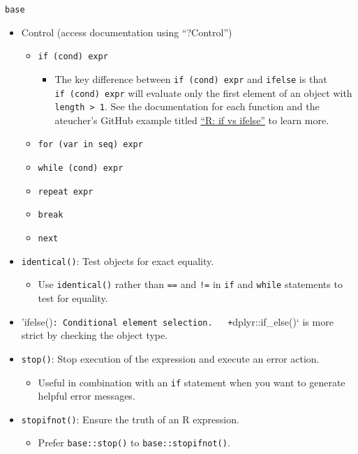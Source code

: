 \documentclass[
]{book}
\providecommand{\tightlist}{%
  \setlength{\itemsep}{0pt}\setlength{\parskip}{0pt}}
\begin{document}
\texttt{base}

\begin{itemize}
\tightlist
\item
  Control (access documentation using ``?Control'')

  \begin{itemize}
  \tightlist
  \item
    \texttt{if\ (cond)\ expr}

    \begin{itemize}
    \tightlist
    \item
      The key difference between \texttt{if\ (cond)\ expr} and \texttt{ifelse} is that \texttt{if\ (cond)\ expr} will evaluate only the first element of an object with \texttt{length\ \textgreater{}\ 1}. See the documentation for each function and the ateucher's GitHub example titled \href{https://gist.github.com/ateucher/c7359f566eded9fcd4a255f4cbd4fe67}{``R: if vs ifelse''} to learn more.
    \end{itemize}
  \item
    \texttt{for\ (var\ in\ seq)\ expr}
  \item
    \texttt{while\ (cond)\ expr}
  \item
    \texttt{repeat\ expr}
  \item
    \texttt{break}
  \item
    \texttt{next}
  \end{itemize}
\item
  \texttt{identical()}: Test objects for exact equality.

  \begin{itemize}
  \tightlist
  \item
    Use \texttt{identical()} rather than \texttt{==} and \texttt{!=} in \texttt{if} and \texttt{while} statements to test for equality.
  \end{itemize}
\item
  'ifelse()\texttt{:\ Conditional\ element\ selection.\ \ \ +}dplyr::if\_else()` is more strict by checking the object type.
\item
  \texttt{stop()}: Stop execution of the expression and execute an error action.

  \begin{itemize}
  \tightlist
  \item
    Useful in combination with an \texttt{if} statement when you want to generate helpful error messages.
  \end{itemize}
\item
  \texttt{stopifnot()}: Ensure the truth of an R expression.

  \begin{itemize}
  \tightlist
  \item
    Prefer \texttt{base::stop()} to \texttt{base::stopifnot()}.
  \end{itemize}
\end{itemize}
\end{document}
